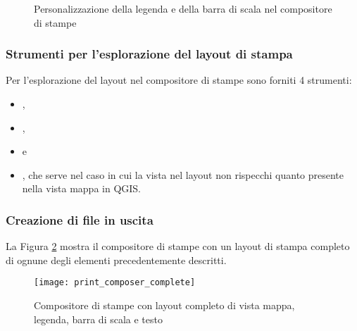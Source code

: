 \begin{figure}[ht]
\centering
\caption{Personalizzazione della legenda e della barra di scala nel
compositore di stampe \nixcaption}\label{fig:print_composer_tab1}
   \goodgap
\end{figure}

\subsubsection{Strumenti per l'esplorazione del layout di stampa}

Per l'esplorazione del layout nel compositore di stampe sono forniti 4
strumenti:

\begin{itemize}
\item {},
\item {},
\item {} e
\item {}, che serve nel caso in cui
la vista nel layout non rispecchi quanto presente nella vista mappa in QGIS. 
\end{itemize}

\subsubsection{Creazione di file in uscita}

La Figura \ref{fig:print_composer_complete} mostra il compositore di stampe
con un layout di stampa completo di ognune degli elementi precedentemente
descritti.

\begin{figure}[h]
   \begin{center}
   \caption{Compositore di stampe con layout completo di vista mappa, legenda,
   barra di scala e testo \nixcaption}
   \label{fig:print_composer_complete}\smallskip
   \texttt{[image: print\_composer\_complete]}
\end{center}  
\end{figure}

